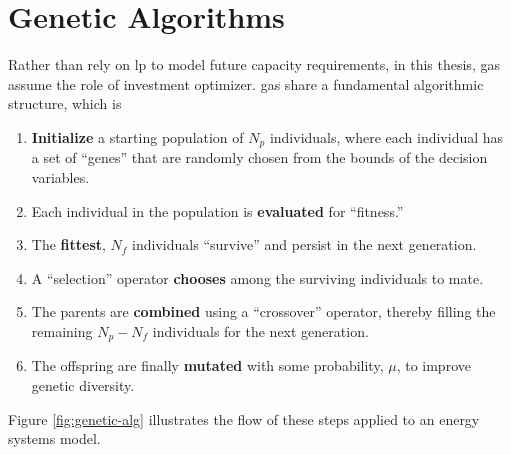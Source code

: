 \section{Genetic Algorithms}
\label{section:genetic-algorithms}

Rather than rely on \ac{lp} to model future capacity requirements, in this thesis, \acp{ga} assume the role of investment optimizer. \acp{ga} share a fundamental 
algorithmic structure, which is \cite{blank_pymoo_2020}
\begin{enumerate}
    \item \textbf{Initialize} a starting population of $N_p$ individuals, where each 
    individual has a set of ``genes'' that are randomly chosen from the bounds of the 
    decision variables.
    \item Each individual in the population is \textbf{evaluated} for ``fitness.'' 
    \item The \textbf{fittest}, $N_f$ individuals ``survive'' and persist in the next generation.
    \item A ``selection'' operator \textbf{chooses} among the surviving individuals to mate.
    \item The parents are \textbf{combined} using a ``crossover'' operator, thereby filling the remaining $N_p - N_f$ individuals for the next generation.
    \item The offspring are finally \textbf{mutated} with some 
    probability, $\mu$, to improve genetic diversity.
\end{enumerate}
\noindent
Figure \ref{fig:genetic-alg} illustrates the flow of these steps applied to
an energy systems model.

